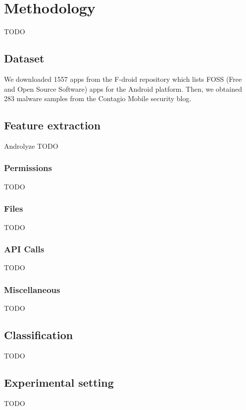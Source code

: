 \section{Methodology}
TODO

\subsection{Dataset}
We downloaded 1557 apps from the F-droid \cite{fdroid} repository which lists FOSS (Free and Open Source Software) apps for the Android platform. Then, we obtained 283 malware samples from the Contagio Mobile \cite{contagion} security blog.

\subsection{Feature extraction}
Androlyze TODO
\subsubsection{Permissions}
TODO
\subsubsection{Files}
TODO
\subsubsection{API Calls}
TODO
\subsubsection{Miscellaneous}
TODO

\subsection{Classification}
TODO

\subsection{Experimental setting}
TODO